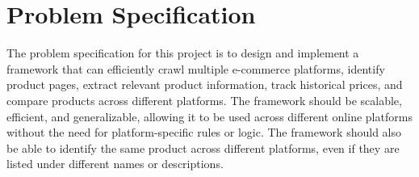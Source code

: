 \section{Problem Specification}\label{sec:problem-specification}
The problem specification for this project is to design and implement a framework that can efficiently crawl multiple e-commerce platforms, identify product pages, extract relevant product information, track historical prices, and compare products across different platforms.
The framework should be scalable, efficient, and generalizable, allowing it to be used across different online platforms without the need for platform-specific rules or logic.
The framework should also be able to identify the same product across different platforms, even if they are listed under different names or descriptions.
